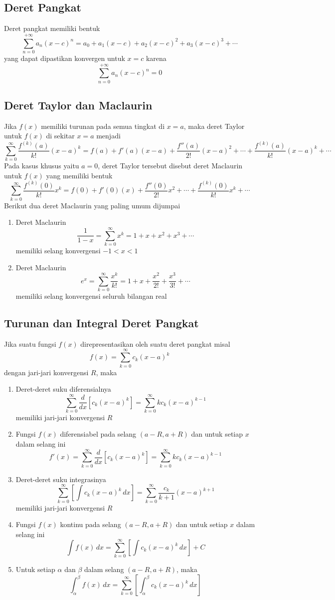 \documentclass{article}
\begin{document}
\subsection{Deret Pangkat}
Deret pangkat memiliki bentuk 
$$ \sum_{n=0}^{+\infty} a_n(x-c)^n = a_0+a_1(x-c)+a_2(x-c)^2+a_3(x-c)^3+\cdots $$
yang dapat dipastikan konvergen untuk $x=c$ karena 
$$ \sum_{n=0}^{+\infty} a_n(x-c)^n = 0 $$
\subsection{Deret Taylor dan Maclaurin}
Jika $f(x)$ memiliki turunan pada semua tingkat di $x=a$, maka deret Taylor untuk $f(x)$ di sekitar $x=a$ menjadi
$$ \sum_{k=0}^\infty \dfrac{f^{(k)}(a)}{k!} (x-a)^k = f(a)+f'(a)(x-a)+\dfrac{f''(a)}{2!}(x-a)^2+\cdots +\dfrac{f^{(k)}(a)}{k!}(x-a)^k +\cdots $$
Pada kasus khusus yaitu $a=0$, deret Taylor tersebut disebut deret Maclaurin untuk $f(x)$ yang memiliki bentuk
$$ \sum_{k=0}^\infty \dfrac{f^{(k)}(0)}{k!} x^k = f(0)+f'(0)(x)+\dfrac{f''(0)}{2!}x^2+\cdots +\dfrac{f^{(k)}(0)}{k!}x^k+\cdots $$
Berikut dua deret Maclaurin yang paling umum dijumpai
\begin{enumerate}
	\item Deret Maclaurin
	$$ \dfrac{1}{1-x} = \sum_{k=0}^\infty x^k = 1+x+x^2+x^3+\cdots $$
	memiliki selang konvergensi $-1<x<1$
	\item Deret Maclaurin
	$$ e^x = \sum_{k=0}^\infty \dfrac{x^k}{k!} = 1+x+\dfrac{x^2}{2!}+\dfrac{x^3}{3!} + \cdots $$
	memiliki selang konvergensi seluruh bilangan real
\end{enumerate}
\subsection{Turunan dan Integral Deret Pangkat}
Jika suatu fungsi $f(x)$ direpresentasikan oleh suatu deret pangkat misal
$$ f(x) = \sum_{k=0}^\infty c_k(x-a)^k $$
dengan jari-jari konvergensi $R$, maka 
\begin{enumerate}
	\item Deret-deret suku diferensialnya 
	$$ \sum_{k=0}^\infty \dfrac{d}{dx} [c_k(x-a)^k] = \sum_{k=0}^\infty kc_k (x-a)^{k-1} $$
	memiliki jari-jari konvergensi $R$
	\item Fungsi $f(x)$ diferensiabel pada selang $(a-R,a+R)$ dan untuk setiap $x$ dalam selang ini 
	$$ f'(x) = \sum_{k=0}^\infty \dfrac{d}{dx} [c_k(x-a)^k] = \sum_{k=0}^\infty kc_k(x-a)^{k-1} $$
	\item Deret-deret suku integrasinya 
	$$ \sum_{k=0}^\infty \left[\int c_k(x-a)^k \, dx\right] = \sum_{k=0}^\infty \dfrac{c_k}{k+1} (x-a)^{k+1} $$
	memiliki jari-jari konvergensi $R$
	\item Fungsi $f(x)$ kontinu pada selang $(a-R,a+R)$ dan untuk setiap $x$ dalam selang ini
	$$ \int f(x)\, dx = \sum_{k=0}^\infty \left[\int c_k(x-a)^k \, dx\right] +C $$
	\item Untuk setiap $\alpha$ dan $\beta$ dalam selang $(a-R,a+R)$, maka
	$$ \int_\alpha^\beta f(x)\, dx = \sum_{k=0}^\infty \left[\int_\alpha^\beta c_k(x-a)^k \, dx\right]$$ 
\end{enumerate}
\end{document}
